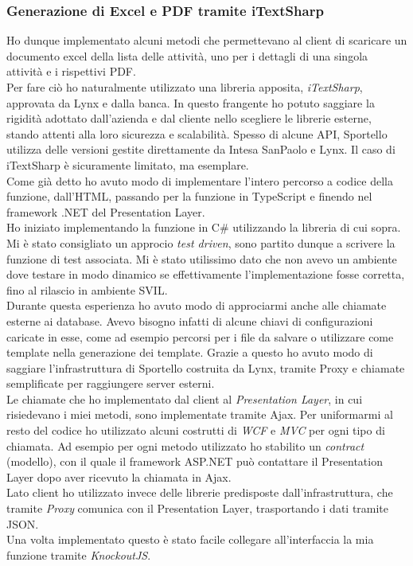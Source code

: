 \subsubsection{Generazione di Excel e PDF tramite iTextSharp}
Ho dunque implementato alcuni metodi che permettevano al client di scaricare un documento excel della lista delle attività, uno per i dettagli di una singola attività e i rispettivi PDF. \\
Per fare ciò ho naturalmente utilizzato una libreria apposita, \textit{iTextSharp}, approvata da Lynx e dalla banca. In questo frangente ho potuto saggiare la rigidità adottato dall'azienda e dal cliente nello scegliere le librerie esterne, stando attenti alla loro sicurezza e scalabilità. Spesso di alcune API, Sportello utilizza delle versioni gestite direttamente da Intesa SanPaolo e Lynx. Il caso di iTextSharp è sicuramente limitato, ma esemplare. \\
Come già detto ho avuto modo di implementare l'intero percorso a codice della funzione, dall'HTML, passando per la funzione in TypeScript e finendo nel framework .NET del Presentation Layer. \\
Ho iniziato implementando la funzione in C\# utilizzando la libreria di cui sopra. Mi è stato consigliato un approcio \textit{test driven}, sono partito dunque a scrivere la funzione di test associata. Mi è stato utilissimo dato che non avevo un ambiente dove testare in modo dinamico se effettivamente l'implementazione fosse corretta, fino al rilascio in ambiente SVIL. \\
Durante questa esperienza ho avuto modo di approciarmi anche alle chiamate esterne ai database. Avevo bisogno infatti di alcune chiavi di configurazioni caricate in esse, come ad esempio percorsi per i file da salvare o utilizzare come template nella generazione dei template. Grazie a questo ho avuto modo di saggiare l'infrastruttura di Sportello costruita da Lynx, tramite Proxy e chiamate semplificate per raggiungere server esterni. \\
Le chiamate che ho implementato dal client al \textit{Presentation Layer}, in cui risiedevano i miei metodi, sono implementate tramite Ajax. Per uniformarmi al resto del codice ho utilizzato alcuni costrutti di \textit{WCF} e \textit{MVC} per ogni tipo di chiamata. Ad esempio per ogni metodo utilizzato ho stabilito un \textit{contract} (modello), con il quale il framework ASP.NET può contattare il Presentation Layer dopo aver ricevuto la chiamata in Ajax. \\
Lato client ho utilizzato invece delle librerie predisposte dall'infrastruttura, che tramite \textit{Proxy} comunica con il Presentation Layer, trasportando i dati tramite JSON. \\
Una volta implementato questo è stato facile collegare all'interfaccia la mia funzione tramite \textit{KnockoutJS}.

